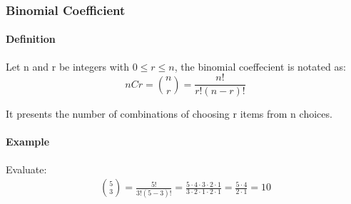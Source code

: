 \subsubsection*{Binomial Coefficient}
\paragraph*{Definition}
Let n and r be integers with $0 \leq r \leq n$, the binomial coeffecient is notated as:
\begin{equation*}
    nCr = \binom{n}{r} = \frac{n!}{r!(n-r)!}
\end{equation*}

It presents the number of combinations of choosing r items from n choices.

\paragraph*{Example}
Evaluate:
\begin{align*}
    \binom{5}{3} = \frac{5!}{3!(5-3)!} = \frac{5 \cdot 4 \cdot 3 \cdot 2 \cdot 1}{3 \cdot 2 \cdot 1 \cdot 2 \cdot 1} = \frac{5 \cdot 4}{2 \cdot 1} = 10
\end{align*}